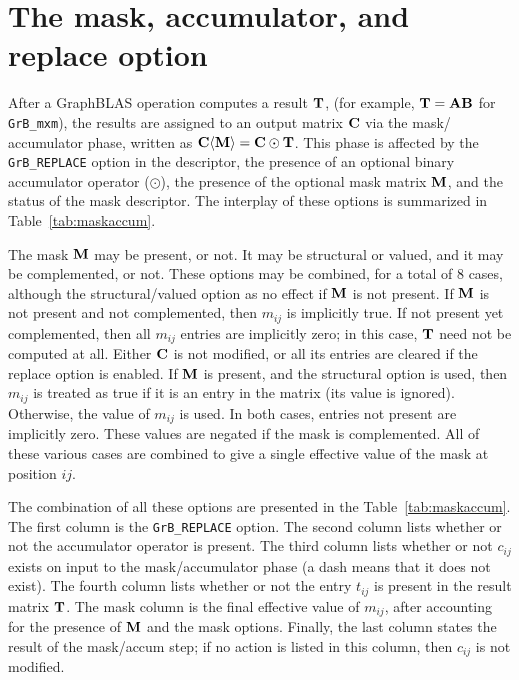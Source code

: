 
\newpage
\section{The mask, accumulator, and replace option} %
\label{sec:maskaccum}

After a GraphBLAS operation computes a result ${\bf T}$, (for example, ${\bf
T=AB}$ for \verb'GrB_mxm'), the results are assigned to an output matrix ${\bf
C}$ via the mask/ accumulator phase, written as ${\bf C \langle M \rangle = C
\odot T}$.  This phase is affected by the \verb'GrB_REPLACE' option in the
descriptor, the presence of an optional binary accumulator operator ($\odot$),
the presence of the optional mask matrix ${\bf M}$, and the status of the mask
descriptor.  The interplay of these options is summarized in
Table~\ref{tab:maskaccum}.

The mask ${\bf M}$ may be present, or not.  It may be structural or valued, and
it may be complemented, or not.  These options may be combined, for a total of
8 cases, although the structural/valued option as no effect if ${\bf M}$ is not
present.  If ${\bf M}$ is not present and not complemented, then $m_{ij}$ is
implicitly true.  If not present yet complemented, then all $m_{ij}$ entries are
implicitly zero; in this case, ${\bf T}$ need not be computed at all.  Either
${\bf C}$ is not modified, or all its entries are cleared if the replace option
is enabled.  If ${\bf M}$ is present, and the structural option is used, then
$m_{ij}$ is treated as true if it is an entry in the matrix (its value is
ignored).  Otherwise, the value of $m_{ij}$ is used.  In both cases, entries
not present are implicitly zero.  These values are negated if the mask is
complemented.  All of these various cases are combined to give a single
effective value of the mask at position ${ij}$.

The combination of all these options are presented in the
Table~\ref{tab:maskaccum}.  The first column is the \verb'GrB_REPLACE' option.
The second column lists whether or not the accumulator operator is present.
The third column lists whether or not $c_{ij}$ exists on input to the
mask/accumulator phase (a dash means that it does not exist).  The fourth
column lists whether or not the entry $t_{ij}$ is present in the result matrix
${\bf T}$.  The mask column is the final effective value of $m_{ij}$, after
accounting for the presence of ${\bf M}$ and the mask options.  Finally, the
last column states the result of the mask/accum step; if no action is listed in
this column, then $c_{ij}$ is not modified.

